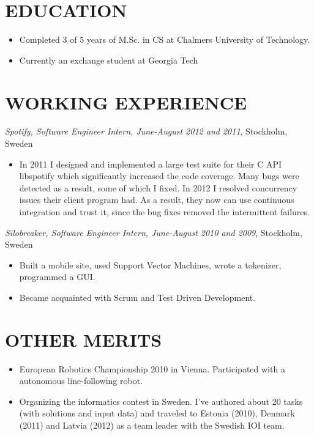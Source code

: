 \documentclass[11pt]{res} %
\begin{document}
\begin{resume}
\section{EDUCATION}
 \begin{itemize} %
   \item Completed 3 of 5 years of M.Sc. in CS
  at Chalmers University of Technology.

   \item Currently an exchange student at Georgia Tech
 \end{itemize}

\section{WORKING EXPERIENCE}
\emph{Spotify, Software Engineer Intern, June-August 2012 and 2011}, Stockholm, Sweden
\vspace{0.2in}
   \begin{itemize} %
   \item In 2011 I designed and implemented a large test suite for their C API
     libspotify which significantly increased the code coverage. Many bugs were
     detected as a result, some of which I fixed. In 2012 I resolved
     concurrency issues their client program had. As a result, they now can use
     continuous integration and trust it, since the bug fixes removed the
     intermittent failures.

 \end{itemize}


\emph{Silobreaker, Software Engineer Intern, June-August 2010 and 2009}, Stockholm, Sweden
\vspace{0.2in}
 \begin{itemize} %
  \item Built a mobile site, used Support Vector Machines, wrote a tokenizer,
   programmed a GUI.
  \item Became acquainted with Scrum and Test Driven Development.
\end{itemize}

\section{OTHER MERITS}

   \begin{itemize} %
   \item European Robotics Championship 2010 in Vienna.
    Participated with a autonomous line-following robot.
   \item Organizing the informatics contest in Sweden.  I've authored about
     20 tasks (with solutions and input data) and traveled to Estonia (2010),
     Denmark (2011) and Latvia (2012) as a team leader with the Swedish IOI
     team.
 \end{itemize}

\end{resume}
\end{document}
